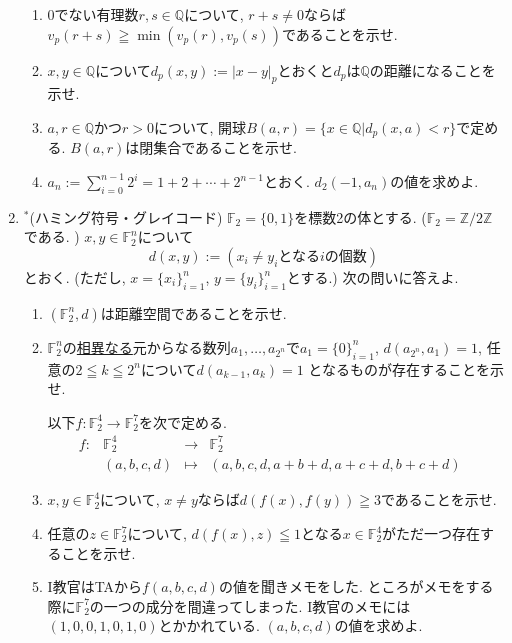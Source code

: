 \documentclass[dvipdfmx,a4paper,11pt]{article}
\newcommand{\Z}{\mathbb{Z}}
\newcommand{\Q}{\mathbb{Q}}
\theoremstyle{definition}
\begin{document}
\begin{enumerate}[label=\textbf{問}\ref*{sec-11}.\arabic*]
  \begin{enumerate}[label=(\arabic*).]
 \setlength{\parskip}{0cm}
  \setlength{\itemsep}{0pt} 
\item 0でない有理数$r,s \in \Q$について, $r+s \neq 0$ならば$v_{p}(r+s) \geqq \min(v_{p}(r), v_{p}(s))$であることを示せ.
\item $x,y \in \Q$について$d_{p}(x,y) :=|x-y|_{p} $とおくと$d_{p}$は$\Q$の距離になることを示せ.
\item $a,r \in \Q$かつ$r>0$について, 開球$B(a,r)=\{x \in \Q | d_{p}(x,a) < r \}$で定める. $B(a,r)$は閉集合であることを示せ.
\item $a_n := \sum_{i=0}^{n-1}2^i =1 + 2 + \cdots + 2^{n-1}$とおく. $d_{2}(-1, a_{n})$の値を求めよ. 
\end{enumerate}

\newpage
\item $^{*}$(ハミング符号・グレイコード)
$\mathbb{F}_{2}=\{0,1\}$を標数2の体とする. ($\mathbb{F}_2=\Z/2\Z$である. )
$x,y \in \mathbb{F}_{2}^{n}$について
$$
d(x,y):= (\text{$x_i \neq y_i$となる$i$の個数})
$$
とおく. (ただし, $x=\{ x_i\}_{i=1}^{n}$, $y=\{ y_i\}_{i=1}^{n}$とする.) 次の問いに答えよ.
  \begin{enumerate}[label=(\arabic*).]
 \setlength{\parskip}{0cm}
  \setlength{\itemsep}{0pt}
\item $(\mathbb{F}_{2}^{n}, d)$は距離空間であることを示せ.
\item $\mathbb{F}_{2}^{n}$の\underline{相異なる}元からなる数列$a_{1}, \ldots, a_{2^n }$で$a_1=\{ 0\}_{i=1}^{n}$, $d(a_{2^n }, a_{1})=1$, 任意の$2 \leqq k \leqq 2^{n}$について$d(a_{k-1},a_{k})=1$
 となるものが存在することを示せ.
 
 \hspace{-22pt}以下$f : \mathbb{F}_{2}^{4} \to \mathbb{F}_{2}^{7}$を次で定める.
$$
\begin{array}{ccccc}
f: &\mathbb{F}_{2}^{4}& \rightarrow & \mathbb{F}_{2}^{7}& \\
&(a,b,c,d) & \longmapsto & 
(a,b,c,d,a+b+d, a+c+d, b+c+d)&
\end{array}
$$


\item $x, y \in \mathbb{F}_{2}^{4}$について, $x\neq y$ならば$d(f(x), f(y)) \geqq 3$であることを示せ.
\item 任意の$z \in \mathbb{F}_{2}^{7}$について, $d(f(x), z) \leqq 1$となる$x \in \mathbb{F}_{2}^{4} $がただ一つ存在することを示せ.
\item I教官はTAから$f(a,b,c,d)$の値を聞きメモをした. ところがメモをする際に$\mathbb{F}_{2}^{7}$の一つの成分を間違ってしまった.  I教官のメモには$(1,0,0,1,0,1,0)$とかかれている. $(a,b,c,d)$の値を求めよ. 
  \end{enumerate}
  
 \end{enumerate}
\end{document}
